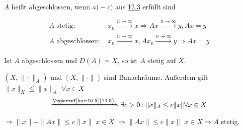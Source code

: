 \begin{definition}
	$A$ hei{\ss}t abgeschlossen, wenn $a) - c)$ aus \hyperref[satz:12.3]{12.3} erfüllt sind	
\end{definition}


\begin{bemerkung}
	\begin{align*}
		A \text{ stetig: } & x_{n} \xrightarrow[]{n \rightarrow \infty} x \Rightarrow Ax_{} \xrightarrow[]{n \rightarrow \infty} y, Ax = y \\
		A \text{ abgeschlossen: } & x_{n} \xrightarrow[]{n \rightarrow \infty} x, A x_{n} \xrightarrow[]{n \rightarrow \infty} y \Rightarrow Ax = y
	\end{align*}
\end{bemerkung}


\begin{satz}  \label{satz:12.6-abgeschlossenenGraphen}
	Ist $A$ abgeschlossen und $D(A) = X$, so ist $A$ stetig auf $X$.
\end{satz}

\begin{beweis}
	$(X, \| \cdot \|_{A})$ und $(X, \| \cdot \|)$ sind Banachräume. Au{\ss}erdem gilt $\| x \|_{X} \leq \| x \|_{A}$ $\forall x \in X$ \\
	\[ \xRightarrow[]{\hyperref[kor:10.5]{10.5}} \exists c > 0: \| x \|_{A} \leq c \| x \| \forall x \in X \]
	$\Rightarrow \| x \| + \| A x \| \leq c \| x \|$ $x \in X $ $\Rightarrow \| A x \| \leq c \| x \|$ $x \in X \Rightarrow A$ stetig. 
\end{beweis}


